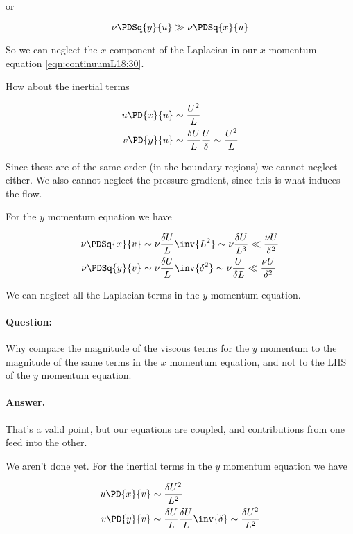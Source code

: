or

\begin{equation}\label{eqn:continuumL18:190}
\nu \PDSq{y}{u} \gg \nu \PDSq{x}{u}
\end{equation}

So we can neglect the $x$ component of the Laplacian in our $x$ momentum equation \ref{eqn:continuumL18:30}.

How about the inertial terms

\begin{align}\label{eqn:continuumL18:210}
u \PD{x}{u} &\sim \frac{U^2}{L} \\
v \PD{y}{u} &\sim \frac{\delta U}{L} \frac{U}{\delta} \sim \frac{U^2}{L}
\end{align}

Since these are of the same order (in the boundary regions) we cannot neglect either.  We also cannot neglect the pressure gradient, since this is what induces the flow.

For the $y$ momentum equation we have

\begin{align}\label{eqn:continuumL18:230}
\nu \PDSq{x}{v} &\sim \nu \frac{\delta U}{L} \inv{L^2} \sim \nu \frac{\delta U}{L^3} \ll \frac{\nu U}{\delta^2} \\
\nu \PDSq{y}{v} &\sim \nu \frac{\delta U}{L} \inv{\delta^2} \sim \nu \frac{U}{\delta L} \ll \frac{\nu U}{\delta^2}
\end{align}

We can neglect all the Laplacian terms in the $y$ momentum equation.

\paragraph{Question:} Why compare the magnitude of the viscous terms for the $y$ momentum to the magnitude of the same terms in the $x$ momentum equation, and not to the LHS of the $y$ momentum equation.

\paragraph{Answer.} That's a valid point, but our equations are coupled, and contributions from one feed into the other.

We aren't done yet.  For the inertial terms in the $y$ momentum equation we have

\begin{align}\label{eqn:continuumL18:250}
u \PD{x}{v} &\sim \frac{\delta U^2}{L^2} \\
v \PD{y}{v} &\sim \frac{\delta U}{L} \frac{\delta U}{L} \inv{\delta} \sim \frac{\delta U^2}{L^2}
\end{align}

